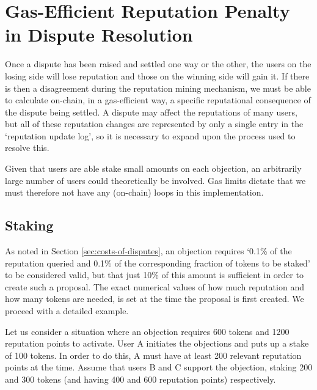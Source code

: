 \section{Gas-Efficient Reputation Penalty in Dispute Resolution}\label{appendix:rep-transfer}

Once a dispute has been raised and settled one way or the other, the users on the losing side will lose reputation and those on the winning side will gain it. If there is then a disagreement during the reputation mining mechanism, we must be able to calculate on-chain, in a gas-efficient way, a specific reputational consequence of the dispute being settled. A dispute may affect the reputations of many users, but all of these reputation changes are represented by only a single entry in the `reputation update log', so it is necessary to expand upon the process used to resolve this.

Given that users are able stake small amounts on each objection, an arbitrarily large number of users could theoretically be involved. Gas limits dictate that we must therefore not have any (on-chain) loops in this implementation.

\subsection{Staking}

As noted in Section \ref{sec:costs-of-disputes}, an objection requires `0.1\% of the reputation queried and 0.1\% of the corresponding fraction of tokens to be staked' to be considered valid, but that just 10\% of this amount is sufficient in order to create such a proposal. The exact numerical values of how much reputation and how many tokens are needed, is set at the time the proposal is first created. We proceed with a detailed example.

Let us consider a situation where an objection requires 600 tokens and 1200 reputation points to activate. User A initiates the objections and puts up a stake of 100 tokens. In order to do this, A must have at least 200 relevant reputation points at the time. Assume that users B and C support the objection, staking 200 and 300 tokens (and having 400 and 600 reputation points) respectively.

